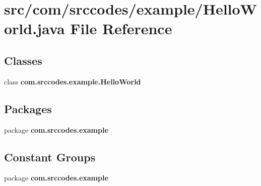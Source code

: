 \section{src/com/srccodes/example/\-Hello\-World.java File Reference}
\label{_hello_world_8java}
\subsection*{Classes}
\begin{DoxyCompactItemize}
\item 
class {\bf com.\-srccodes.\-example.\-Hello\-World}
\end{DoxyCompactItemize}
\subsection*{Packages}
\begin{DoxyCompactItemize}
\item 
package {\bf com.\-srccodes.\-example}
\end{DoxyCompactItemize}
\subsection*{Constant Groups}
\begin{DoxyCompactItemize}
\item 
package {\bf com.\-srccodes.\-example}
\end{DoxyCompactItemize}
